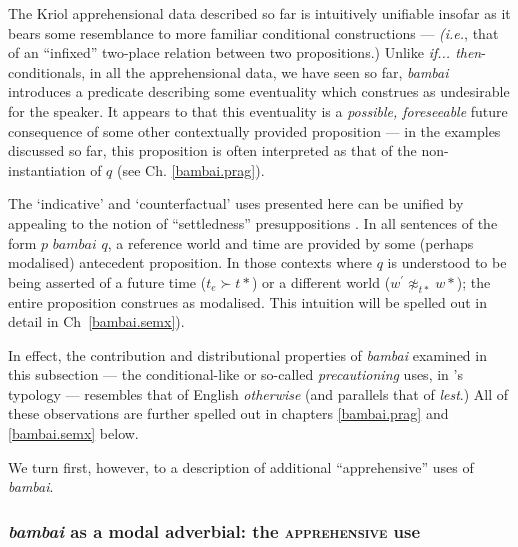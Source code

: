 \xe

The Kriol apprehensional data described so far is intuitively unifiable insofar as it bears some resemblance to more familiar conditional constructions --- \textit{(i.e.}, that of an ``infixed'' two-place relation between two propositions.) Unlike \textit{if... then}-conditionals, in all the apprehensional data, we have seen so far, \textit{bambai} introduces a predicate describing some eventuality which construes as undesirable for the speaker. It appears to that this eventuality is a \textit{possible, foreseeable} future consequence of some other contextually provided proposition --- in the examples discussed so far, this proposition is often interpreted as that of the non-instantiation of $ q $ (see Ch. \ref{bambai.prag}). 

The `indicative' and `counterfactual' uses presented here can be unified by appealing to the notion of ``settledness'' presuppositions \citep[\textit{e.g.,}][82, \textit{passim}]{Condoravdi2002}. In all sentences of the form $ p \textit{ bambai }q$, a reference world and time are provided by some (perhaps modalised) antecedent proposition. In those contexts where $ q $ is understood to be being asserted of a future time ($t_e\succ t*$) or a different world ($w^\prime\not\approx_{t*} w*$); 
 the entire proposition construes as modalised. This intuition will be spelled out in detail in Ch~\ref{bambai.semx}).  %

In effect, the contribution and distributional properties of \textit{bambai} examined in this subsection --- the conditional-like or so-called \textit{precautioning} uses, in \citeauthor{Lichtenberk1995}'s typology --- resembles that of English \textit{otherwise} (and parallels that of \textit{lest}.)
All of these observations are further spelled out in chapters \ref{bambai.prag} and \ref{bambai.semx} below. 

We turn first, however, to a description of additional ``apprehensive'' uses of \textit{bambai}.

\subsubsection[Apprehensive uses]{\textit{bambai} as a modal adverbial: the \textsc{apprehensive} use}
\label{ep.adv}


